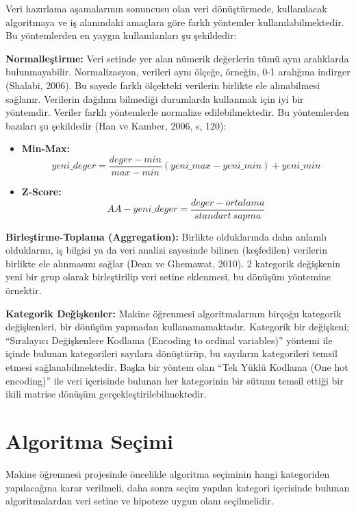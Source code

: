 \documentclass[12pt,twoside]{deuthesis}
\begin{document}
Veri hazırlama aşamalarının sonuncusu olan veri dönüştürmede, kullanılacak algoritmaya ve iş alanındaki amaçlara göre farklı yöntemler kullanılabilmektedir. Bu yöntemlerden en yaygın kullanılanları şu şekildedir:

\textbf{Normalleştirme:} Veri setinde yer alan nümerik değerlerin tümü aynı aralıklarda bulunmayabilir. Normalizasyon, verileri aynı ölçeğe, örneğin, 0-1 aralığına indirger (Shalabi, 2006). Bu sayede farklı ölçekteki verilerin birlikte ele alınabilmesi sağlanır. Verilerin dağılımı bilmediği durumlarda kullanmak için iyi bir yöntemdir. Veriler farklı yöntemlerle normalize edilebilmektedir. Bu yöntemlerden bazıları şu şekildedir (Han ve Kamber, 2006, s, 120):
\begin{itemize}
\item
  \textbf{Min-Max:}
  \[
  {yeni\_deger}=\frac{deger-min}{max-min}(yeni\_max-yeni\_min)+yeni\_min
  \]
\item
  \textbf{Z-Score:}\\
  \[
  AA-yeni\_deger=\frac{deger-ortalama}{standart\ sapma}
  \]
\end{itemize}
\textbf{Birleştirme-Toplama (Aggregation):} Birlikte olduklarında daha anlamlı olduklarını, iş bilgisi ya da veri analizi sayesinde bilinen (keşfedilen) verilerin birlikte ele alınmasını sağlar (Dean ve Ghemawat, 2010). 2 kategorik değişkenin yeni bir grup olarak birleştirilip veri setine eklenmesi, bu dönüşüm yöntemine örnektir.

\textbf{Kategorik Değişkenler:} Makine öğrenmesi algoritmalarının birçoğu kategorik değişkenleri, bir dönüşüm yapmadan kullanamamaktadır. Kategorik bir değişkeni; ``Sıralayıcı Değişkenlere Kodlama (Encoding to ordinal variables)'' yöntemi ile içinde bulunan kategorileri sayılara dönüştürüp, bu sayıların kategorileri temsil etmesi sağlanabilmektedir. Başka bir yöntem olan ``Tek Yüklü Kodlama (One hot encoding)'' ile veri içerisinde bulunan her kategorinin bir sütunu temsil ettiği bir ikili matrise dönüşüm gerçekleştirilebilmektedir.

\hypertarget{algoritma-seuxe7imi}{%
\section{Algoritma Seçimi}\label{algoritma-seuxe7imi}}

Makine öğrenmesi projesinde öncelikle algoritma seçiminin hangi kategoriden yapılacağına karar verilmeli, daha sonra seçim yapılan kategori içerisinde bulunan algoritmalardan veri setine ve hipoteze uygun olanı seçilmelidir.
\end{document}
